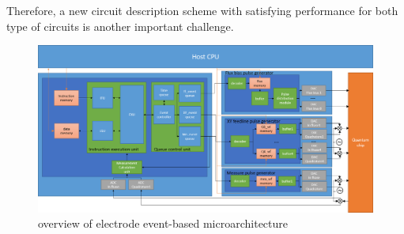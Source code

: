 Therefore, a new circuit description scheme with satisfying performance for both type of circuits is another important challenge.

\begin{figure}[ht]
  \centering
  \includegraphics[width=\linewidth]{figure/4_1}
  \caption{overview of electrode event-based microarchitecture}
  \label{img2}
\end{figure}
